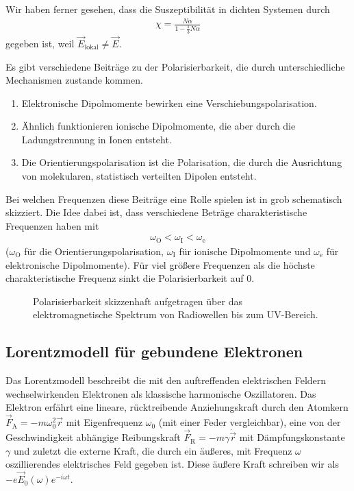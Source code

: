 Wir haben ferner gesehen, dass die Suszeptibilität in dichten Systemen durch
\begin{align*}
    \chi =\frac{N\alpha}{1-\frac{1}{3}N\alpha}
\end{align*}
gegeben ist, weil $\vec E_\mathrm{lokal}\neq\vec E$.

Es gibt verschiedene Beiträge zu der Polarisierbarkeit, die durch unterschiedliche Mechanismen zustande kommen.
\begin{enumerate}
    \item Elektronische Dipolmomente bewirken eine Verschiebungspolarisation.
    \item Ähnlich funktionieren ionische Dipolmomente, die aber durch die Ladungstrennung in Ionen entsteht.
    \item Die Orientierungspolarisation ist die Polarisation, die durch die Ausrichtung von molekularen, statistisch verteilten Dipolen entsteht.
\end{enumerate}

Bei welchen Frequenzen diese Beiträge eine Rolle spielen ist in  grob schematisch skizziert.
Die Idee dabei ist, dass verschiedene Beträge charakteristische Frequenzen haben mit
\begin{align*}
    \omega_\mathrm{O}<\omega_\mathrm{I}<\omega_\mathrm{e}
\end{align*}
($\omega_\mathrm{O}$ für die Orientierungspolarisation, $\omega_\mathrm{I}$ für ionische Dipolmomente und $\omega_\mathrm{e}$ für elektronische Dipolmomente).
Für viel größere Frequenzen als die höchste charakteristische Frequenz sinkt die Polarisierbarkeit auf $0$.

\begin{figure}[htb]
    \centering
    \tfigPolarizabilityOverSpectrum
    \caption{Polarisierbarkeit skizzenhaft aufgetragen über das elektromagnetische Spektrum von Radiowellen bis zum UV-Bereich. }
    \label{fig:polarisierbarkeit_ueber_spektrum}
\end{figure}



\subsection{Lorentzmodell für gebundene Elektronen\label{sec:lorentzmodell_gebundene_elektronen}}

Das Lorentzmodell beschreibt die mit den auftreffenden elektrischen Feldern wechselwirkenden Elektronen als klassische harmonische Oszillatoren.
Das Elektron erfährt eine lineare, rücktreibende Anziehungskraft durch den Atomkern $\vec F_\mathrm{A} = -m\omega_0^2 \vec r$ mit Eigenfrequenz $\omega_0$ (mit einer Feder vergleichbar),
eine von der Geschwindigkeit abhängige Reibungskraft $\vec F_\mathrm{R}=-m\gamma\dot{\vec r}$ mit Dämpfungskonstante $\gamma$ und zuletzt die externe Kraft, die durch ein äußeres, mit Frequenz $\omega$ oszillierendes elektrisches Feld gegeben ist.
Diese äußere Kraft schreiben wir als $-e\vec E_0(\omega)e^{-i\omega t}$.

